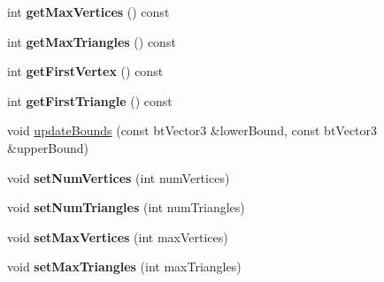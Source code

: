 \begin{DoxyCompactItemize}
int {\bfseries get\+Max\+Vertices} () const
\item 
\mbox{\label{classbtDX11SoftBodySolver_1_1btAcceleratedSoftBodyInterface_ab4b07d4dd494b4838529794fd4a4efea}} 
int {\bfseries get\+Max\+Triangles} () const
\item 
\mbox{\label{classbtDX11SoftBodySolver_1_1btAcceleratedSoftBodyInterface_afda53746c85f7408561f3972ccf5d0ce}} 
int {\bfseries get\+First\+Vertex} () const
\item 
\mbox{\label{classbtDX11SoftBodySolver_1_1btAcceleratedSoftBodyInterface_aa24cc9b003a26e7e7a02ff74e97f9dbe}} 
int {\bfseries get\+First\+Triangle} () const
\item 
void \hyperlink{classbtDX11SoftBodySolver_1_1btAcceleratedSoftBodyInterface_ace99e4c1e9cbb3a08e5d1d2688fc02e2}{update\+Bounds} (const bt\+Vector3 \&lower\+Bound, const bt\+Vector3 \&upper\+Bound)
\item 
\mbox{\label{classbtDX11SoftBodySolver_1_1btAcceleratedSoftBodyInterface_a9356bdddcdc88710ea506ffe90b1086b}} 
void {\bfseries set\+Num\+Vertices} (int num\+Vertices)
\item 
\mbox{\label{classbtDX11SoftBodySolver_1_1btAcceleratedSoftBodyInterface_af9954a8f4eb53a374969e7879ee7e009}} 
void {\bfseries set\+Num\+Triangles} (int num\+Triangles)
\item 
\mbox{\label{classbtDX11SoftBodySolver_1_1btAcceleratedSoftBodyInterface_a3c9ad48eb9011b2e5d8639cbf764b483}} 
void {\bfseries set\+Max\+Vertices} (int max\+Vertices)
\item 
\mbox{\label{classbtDX11SoftBodySolver_1_1btAcceleratedSoftBodyInterface_a70c846da231c446864dea0adfbd7be84}} 
void {\bfseries set\+Max\+Triangles} (int max\+Triangles)
\item 
\mbox{\label{classbtDX11SoftBodySolver_1_1btAcceleratedSoftBodyInterface_a3a0bd4b87e80af3e53bb09ec1fbc3097}} 

\end{DoxyCompactItemize}
